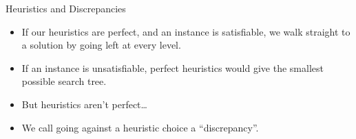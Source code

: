\documentclass{beamer}
\begin{document}
\begin{frame}{Heuristics and Discrepancies}

    \begin{itemize}
        \item If our heuristics are perfect, and an instance is satisfiable, we walk straight to a
            solution by going left at every level.
        \item If an instance is unsatisfiable, perfect heuristics would give the smallest possible
            search tree.
        \item But heuristics aren't perfect\ldots
        \item We call going against a heuristic choice a ``discrepancy''.
    \end{itemize}

\end{frame}
\end{document}
